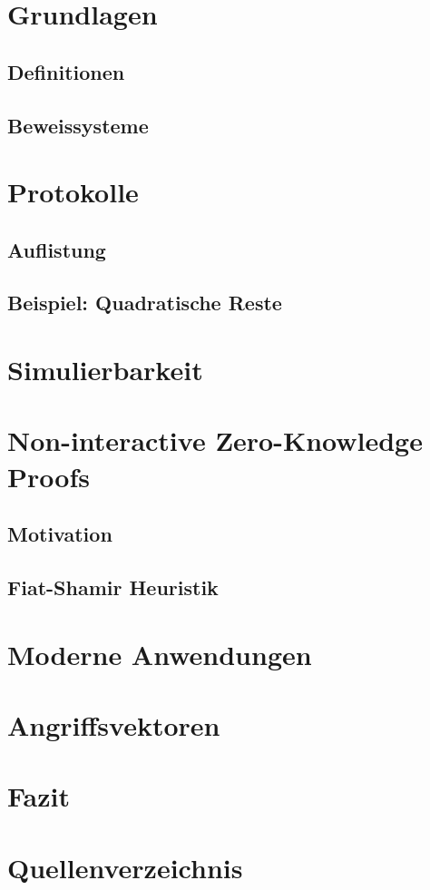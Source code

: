 \documentclass {article}
\begin{document}
\section{Grundlagen}
\subsection{Definitionen}
\subsection{Beweissysteme}
\section{Protokolle}
\subsection{Auflistung}
\subsection{Beispiel: Quadratische Reste}
\section{Simulierbarkeit}
\section{Non-interactive Zero-Knowledge Proofs}
\subsection{Motivation}
\subsection{Fiat-Shamir Heuristik}
\section{Moderne Anwendungen}
\section{Angriffsvektoren}
\section{Fazit}
\section{Quellenverzeichnis}

\nocite{BG89}
\nocite{BM89}
\nocite{GMIR85}
\nocite{GO90}
\nocite{KZKP}
\nocite{PrSa14}
\nocite{RS91}
\nocite{Wik1}
\nocite{Wik2}

\printbibliography


  
\end{document}
